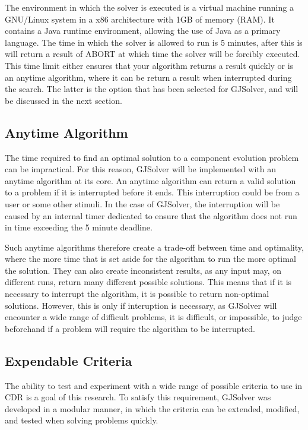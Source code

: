 The environment in which the solver is executed is a virtual machine running a GNU/Linux system in a x86 architecture with 1GB of memory (RAM).
It contains a Java runtime environment, allowing the use of Java as a primary language.
The time in which the solver is allowed to run is 5 minutes, after this is will return a result of ABORT at which time the solver will be forcibly executed.
This time limit either ensures that your algorithm returns a result quickly or is an anytime algorithm, where it can be return a result when interrupted during the search.
The latter is the option that has been selected for GJSolver, and will be discussed in the next section.

\subsection{Anytime Algorithm}
The time required to find an optimal solution to a component evolution problem can be impractical.
For this reason, GJSolver will be implemented with an anytime algorithm at its core.
An anytime algorithm can return a valid solution to a problem if it is interrupted before it ends.
This interruption could be from a user or some other stimuli.
In the case of GJSolver, the interruption will be caused by an internal timer dedicated to ensure that the algorithm does not run in time exceeding the 5 minute deadline.

Such anytime algorithms therefore create a trade-off between time and optimality, where the more time that is set aside for the algorithm to run the more optimal the solution. 
They can also create inconsistent results, as any input may, on different runs, return many different possible solutions.
This means that if it is necessary to interrupt the algorithm, it is possible to return non-optimal solutions.
However, this is only if interuption is necessary, as GJSolver will encounter a wide range of difficult problems, 
it is difficult, or impossible, to judge beforehand if a problem will require the algorithm to be interrupted. 

\subsection{Expendable Criteria}
The ability to test and experiment with a wide range of possible criteria to use in CDR is a goal of this research.
To satisfy this requirement, GJSolver was developed in a modular manner, in which the criteria can be extended, modified, and tested when solving problems quickly.

